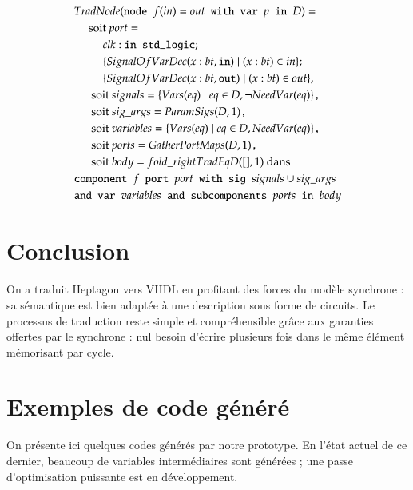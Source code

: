 \documentclass[9pt,a4paper]{article}
\newcommand{\TODO}[1]{}
\newcommand{\LANG}{Heptagon}
\newcommand{\p}[0]{\; \vert \;}
\newcommand{\mybox}[1]{\mbox{\tt{#1}}}
\newcommand{\bl}[0]{\hspace{0.45cm}}
\begin{document}
\begin{align*}
  & TradNode(\mybox{node } f(in) = out \mybox{ with var } p \mybox{ in } D) = \\
  & \bl \mbox{soit } port = \\
  & \bl \bl clk : \mybox{in std\_logic}; \\
  & \bl \bl \{ SignalOfVarDec(x : bt, \mybox{in}) \p (x : bt) \in in \}; \\
  & \bl \bl \{ SignalOfVarDec(x : bt, \mybox{out}) \p (x : bt) \in out \}, \\
  & \bl \mbox{ soit } signals = \{ \V{eq} \p eq \in D, \neg \NV{eq} \}
  \mybox{,} \\
  & \bl \mbox{ soit } sig\_args = \PS{D}{1} \mybox{,} \\
  & \bl \mbox{ soit } variables = \{ \V{eq} \p eq \in D, \NV{eq} \} \mybox{,} \\
  & \bl \mbox{ soit } ports = \GPM{D}{1} \mybox{,} \\
  & \bl \mbox{ soit } body = fold\_right TradEq D ([], 1) \mbox{ dans} \\
  & \mybox{component } f \mybox{ port } port \mybox{ with sig } signals \cup
  sig\_args \\
  & \mybox{and var } variables \mybox{ and subcomponents } ports \mybox{ in }
  body
\end{align*}

\section{Conclusion}

\TODO{À enrichir}

On a traduit \LANG{} vers VHDL en profitant des forces du modèle synchrone : sa
sémantique est bien adaptée à une description sous forme de circuits. Le
processus de traduction reste simple et compréhensible grâce aux garanties
offertes par le synchrone : nul besoin d'écrire plusieurs fois dans le même
élément mémorisant par cycle.

\appendix

\section{Exemples de code généré}

On présente ici quelques codes générés par notre prototype. En l'état actuel de
ce dernier, beaucoup de variables intermédiaires sont générées ; une passe
d'optimisation puissante est en développement.
\end{document}
